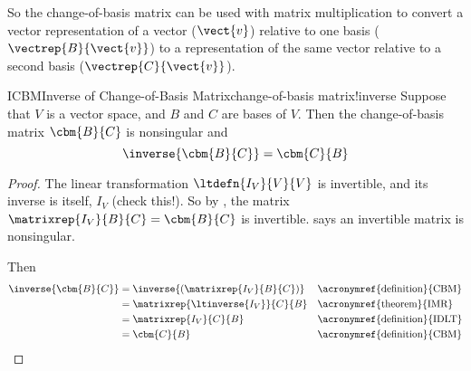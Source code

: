 %
So the change-of-basis matrix can be used with matrix multiplication to convert a vector representation of a vector ($\vect{v}$) relative to one basis ($\vectrep{B}{\vect{v}}$) to a representation of the same vector relative to a second basis ($\vectrep{C}{\vect{v}}$).
%
%
\begin{theorem}{ICBM}{Inverse of Change-of-Basis Matrix}{change-of-basis matrix!inverse}
Suppose that $V$ is a vector space, and $B$ and $C$ are bases of $V$.
Then the change-of-basis matrix $\cbm{B}{C}$ is nonsingular and
%
\begin{equation*}
\inverse{\cbm{B}{C}}=\cbm{C}{B}
\end{equation*}
%
\end{theorem}
%
\begin{proof}
The linear transformation $\ltdefn{I_V}{V}{V}$ is invertible, and its inverse is itself, $I_V$ (check this!). So by , the matrix $\matrixrep{I_V}{B}{C}=\cbm{B}{C}$ is invertible.   says an invertible matrix is nonsingular.\par
%
Then
%
\begin{align*}
\inverse{\cbm{B}{C}}
&=\inverse{\left(\matrixrep{I_V}{B}{C}\right)}&&\text{\acronymref{definition}{CBM}}\\
&=\matrixrep{\ltinverse{I_V}}{C}{B}&&\text{\acronymref{theorem}{IMR}}\\
&=\matrixrep{I_V}{C}{B}&&\text{\acronymref{definition}{IDLT}}\\
&=\cbm{C}{B}&&\text{\acronymref{definition}{CBM}}\\
\end{align*}
%
\end{proof}
%
%
